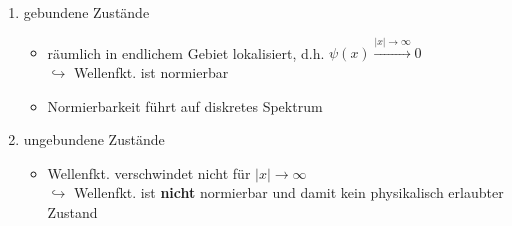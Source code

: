 \documentclass[10pt,article,colorback,accentcolor=tud9d]{scrartcl}
\begin{document}
\begin{itemize}
      \begin{enumerate}
       \item gebundene Zustände
          \begin{itemize}
           \item räumlich in endlichem Gebiet lokalisiert, d.h. $ \psi(x) \xrightarrow{|x| \rightarrow \infty} 0 $\\
           $ \hookrightarrow $ Wellenfkt. ist normierbar
           \item Normierbarkeit führt auf diskretes Spektrum
          \end{itemize}
       \item ungebundene Zustände
          \begin{itemize}
           \item Wellenfkt. verschwindet nicht für $ |x| \rightarrow \infty $\\
           $ \hookrightarrow $ Wellenfkt. ist \textbf{nicht} normierbar und damit kein physikalisch erlaubter Zustand
          \end{itemize}
      \end{enumerate}
\end{itemize}


      
\end{document}
